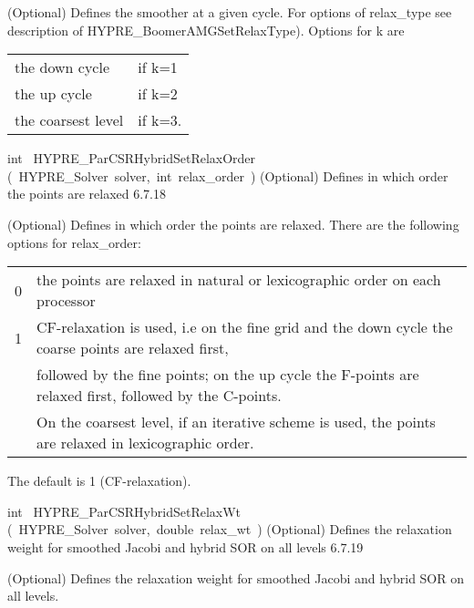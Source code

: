 \documentclass{article}
\begin{document}
\begin{cxxentry}
\begin{cxxentry}
\begin{cxxfunction}
\begin{cxxdoc}
(Optional) Defines the smoother at a given cycle.
For options of relax\_type see
description of HYPRE\_BoomerAMGSetRelaxType). Options for k are

\begin{tabular}{|l|l|} \hline
the down cycle &     if k=1 \\
the up cycle &       if k=2 \\
the coarsest level &  if k=3. \\
\hline
\end{tabular}
\end{cxxdoc}
\end{cxxfunction}
\begin{cxxfunction}
{int\ }
        {HYPRE\_ParCSRHybridSetRelaxOrder}
        {(\ HYPRE\_Solver\ solver,\ int\ relax\_order\ )}
        {
(Optional) Defines in which order the points are relaxed}
        {6.7.18}
\begin{cxxdoc}

(Optional) Defines in which order the points are relaxed. There are
the following options for
relax\_order:

\begin{tabular}{|c|l|} \hline
0 & the points are relaxed in natural or lexicographic
order on each processor \\
1 &  CF-relaxation is used, i.e on the fine grid and the down
cycle the coarse points are relaxed first, \\
& followed by the fine points; on the up cycle the F-points are relaxed
first, followed by the C-points. \\
& On the coarsest level, if an iterative scheme is used,
the points are relaxed in lexicographic order. \\
\hline
\end{tabular}

The default is 1 (CF-relaxation).
\end{cxxdoc}
\end{cxxfunction}
\begin{cxxfunction}
{int\ }
        {HYPRE\_ParCSRHybridSetRelaxWt}
        {(\ HYPRE\_Solver\ solver,\ double\ relax\_wt\ )}
        {
(Optional) Defines the relaxation weight for smoothed Jacobi and hybrid SOR
on all levels}
        {6.7.19}
\begin{cxxdoc}

(Optional) Defines the relaxation weight for smoothed Jacobi and hybrid SOR
on all levels.


\end{cxxdoc}
\end{cxxfunction}
\end{cxxentry}
\end{cxxentry}
\end{document}
